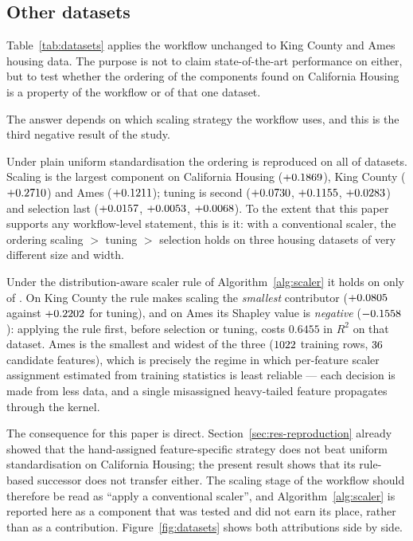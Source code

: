\documentclass[pdflatex,sn-mathphys-num]{sn-jnl}
\begin{document}
\subsection{Other datasets}\label{sec:res-datasets}
Table~\ref{tab:datasets} applies the workflow unchanged to King County and Ames housing data. The purpose is not to claim state-of-the-art performance on either, but to test whether the ordering of the components found on California Housing is a property of the workflow or of that one dataset.



The answer depends on which scaling strategy the workflow uses, and this is the third negative result of the study.

Under plain uniform standardisation the ordering is reproduced on all \NOrderHoldsUni{} of \NDatasets{} datasets. Scaling is the largest component on California Housing ($+0.1869$), King County ($+0.2710$) and Ames ($+0.1211$); tuning is second ($+0.0730$, $+0.1155$, $+0.0283$) and selection last ($+0.0157$, $+0.0053$, $+0.0068$). To the extent that this paper supports any workflow-level statement, this is it: with a conventional scaler, the ordering scaling $>$ tuning $>$ selection holds on three housing datasets of very different size and width.

Under the distribution-aware scaler rule of Algorithm~\ref{alg:scaler} it holds on only \NOrderHoldsAuto{} of \NDatasets{}. On King County the rule makes scaling the \emph{smallest} contributor ($+0.0805$ against $+0.2202$ for tuning), and on Ames its Shapley value is \emph{negative} ($-0.1558$): applying the rule first, before selection or tuning, costs $0.6455$ in $R^2$ on that dataset. Ames is the smallest and widest of the three ($1022$ training rows, $36$ candidate features), which is precisely the regime in which per-feature scaler assignment estimated from training statistics is least reliable --- each decision is made from less data, and a single misassigned heavy-tailed feature propagates through the kernel.

The consequence for this paper is direct. Section~\ref{sec:res-reproduction} already showed that the hand-assigned feature-specific strategy does not beat uniform standardisation on California Housing; the present result shows that its rule-based successor does not transfer either. The scaling stage of the workflow should therefore be read as ``apply a conventional scaler'', and Algorithm~\ref{alg:scaler} is reported here as a component that was tested and did not earn its place, rather than as a contribution. Figure~\ref{fig:datasets} shows both attributions side by side.
\end{document}
